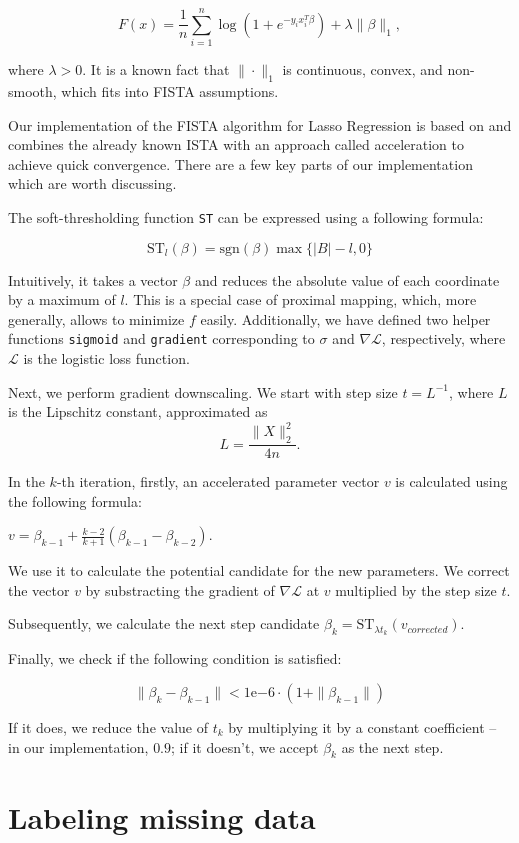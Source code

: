 \documentclass{article}
\begin{document}
$$F(x) = \frac{1}{n} \sum_{i=1}^n \log(1 + e^{-y_i x_i^T \beta}) + \lambda\|\beta\|_1,$$

where $\lambda > 0$. It is a known fact that $\|\cdot\|_1$ is continuous, convex, and non-smooth, which fits into FISTA assumptions.

Our implementation of the FISTA algorithm for Lasso Regression is based on \cite{fista_algo} and combines the already known ISTA with an approach called acceleration to achieve quick convergence. There are a few key parts of our implementation which are worth discussing.

The soft-thresholding function \verb|ST| can be expressed using a following formula:

$$\textrm{ST}_l(\beta) = \textrm{sgn}(\beta) \max\{|B| - l, 0\}$$

Intuitively, it takes a vector $\beta$ and reduces the absolute value of each coordinate by a maximum of $l$. This is a special case of proximal mapping, which, more generally, allows to minimize $f$ easily. Additionally, we have defined two helper functions \verb|sigmoid| and \verb|gradient| corresponding to $\sigma$ and $\nabla \mathcal{L}$, respectively, where $\mathcal{L}$ is the logistic loss function.

Next, we perform gradient downscaling. We start with step size $t = L^{-1}$, where $L$ is the Lipschitz constant, approximated as $$L = \frac{\|X\|^2_2}{4n}.$$ 

In the $k$-th iteration, firstly, an accelerated parameter vector $v$ is calculated using the following formula:

$v = \beta_{k-1} + \frac{k-2}{k+1}(\beta_{k-1} - \beta_{k-2}).$

We use it to calculate the potential candidate for the new parameters. We correct the vector $v$ by substracting the gradient of $\nabla\mathcal{L}$ at $v$ multiplied by the step size $t$. 

Subsequently, we calculate the next step candidate $\beta_k = \textrm{ST}_{\lambda t_k}(v_{corrected})$.

Finally, we check if the following condition is satisfied:

$$\|\beta_k - \beta_{k-1} \| < 1\mathrm{e}{-6} \cdot (1 + \|\beta_{k-1} \|)$$

If it does, we reduce the value of $t_k$ by multiplying it by a constant coefficient -- in our implementation, $0.9$; if it doesn't, we accept $\beta_k$ as the next step.

\section{Labeling missing data}
\end{document}
